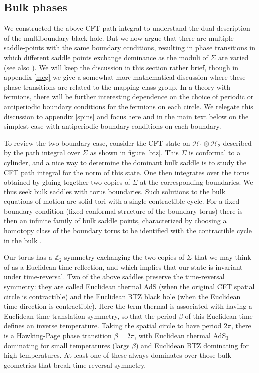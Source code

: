 \documentclass[12pt]{article}
\numberwithin{equation}{section}
\begin{document}
%
\subsection{Bulk phases}
\label{phases}
%

We constructed the above CFT path integral to understand the dual description of the multiboundary black hole.   But we now argue that there are multiple saddle-points with the same boundary conditions, resulting in phase transitions  in which different saddle points exchange dominance  as the moduli of $\Sigma$ are varied (see also \cite{MRta}).  We will keep the discussion in this section rather brief, though in appendix \ref{mcg} we give a somewhat more mathematical discussion where these phase transitions are related to the mapping class group.  In a theory with fermions, there will be further interesting dependence on the choice of periodic or antiperiodic boundary conditions for the fermions on each circle. We relegate this discussion to appendix \ref{spins} and focus here and in the main text below on the simplest case with antiperiodic boundary conditions on each boundary.

To review the two-boundary case, consider the CFT state on $\mathcal{H}_1 \otimes \mathcal{H}_2$ described by the path integral over $\Sigma$ as shown in figure \ref{btz}.  This $\Sigma$ is conformal to a cylinder, and a nice way to determine the dominant bulk saddle is to study the CFT path integral for the norm of this state.  One then integrates over the torus obtained by gluing together two copies of $\Sigma$ at the corresponding boundaries.  We thus seek bulk saddles with torus boundaries.  Such solutions to the bulk equations of motion are solid tori with a single contractible cycle. For a fixed boundary condition (fixed conformal structure of the boundary torus) there is then an infinite family of bulk saddle points, characterized by choosing a homotopy class of the boundary torus to be identified with the contractible cycle in the bulk \cite{Maldacena:1998bw}.

Our torus has a $\mathbb{Z}_2$ symmetry exchanging the two copies of $\Sigma$ that we may think of as a Euclidean time-reflection, and which implies that our state is invariant under time-reversal. Two of the above saddles preserve the time-reversal symmetry: they are called Euclidean thermal AdS (when the original CFT spatial circle is contractible) and the Euclidean BTZ black hole (when the Euclidean time direction is contractible).   Here the term thermal is associated with having a Euclidean time translation symmetry, so that the period $\beta$ of this Euclidean time defines an inverse temperature. Taking the spatial circle to have period $2\pi$, there is a Hawking-Page%
phase transition $\beta = 2\pi$, with Euclidean thermal AdS$_3$ dominating for small temperatures (large $\beta$) and Euclidean BTZ dominating for high temperatures.  At least one of these always dominates over those bulk geometries that break time-reversal symmetry.
\end{document}
